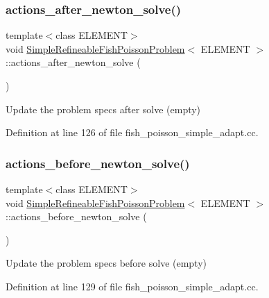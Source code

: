 \subsubsection{\texorpdfstring{actions\+\_\+after\+\_\+newton\+\_\+solve()}{actions\_after\_newton\_solve()}}
{\footnotesize\ttfamily template$<$class E\+L\+E\+M\+E\+NT$>$ \\
void \hyperlink{classSimpleRefineableFishPoissonProblem}{Simple\+Refineable\+Fish\+Poisson\+Problem}$<$ E\+L\+E\+M\+E\+NT $>$\+::actions\+\_\+after\+\_\+newton\+\_\+solve (\begin{DoxyParamCaption}{ }\end{DoxyParamCaption})\hspace{0.3cm}{\ttfamily [inline]}}



Update the problem specs after solve (empty) 



Definition at line 126 of file fish\+\_\+poisson\+\_\+simple\+\_\+adapt.\+cc.

\mbox{\label{classSimpleRefineableFishPoissonProblem_af1b13d49ace6c248a0a8021103f139a5}} 
\subsubsection{\texorpdfstring{actions\+\_\+before\+\_\+newton\+\_\+solve()}{actions\_before\_newton\_solve()}}
{\footnotesize\ttfamily template$<$class E\+L\+E\+M\+E\+NT$>$ \\
void \hyperlink{classSimpleRefineableFishPoissonProblem}{Simple\+Refineable\+Fish\+Poisson\+Problem}$<$ E\+L\+E\+M\+E\+NT $>$\+::actions\+\_\+before\+\_\+newton\+\_\+solve (\begin{DoxyParamCaption}{ }\end{DoxyParamCaption})\hspace{0.3cm}{\ttfamily [inline]}}



Update the problem specs before solve (empty) 



Definition at line 129 of file fish\+\_\+poisson\+\_\+simple\+\_\+adapt.\+cc.

